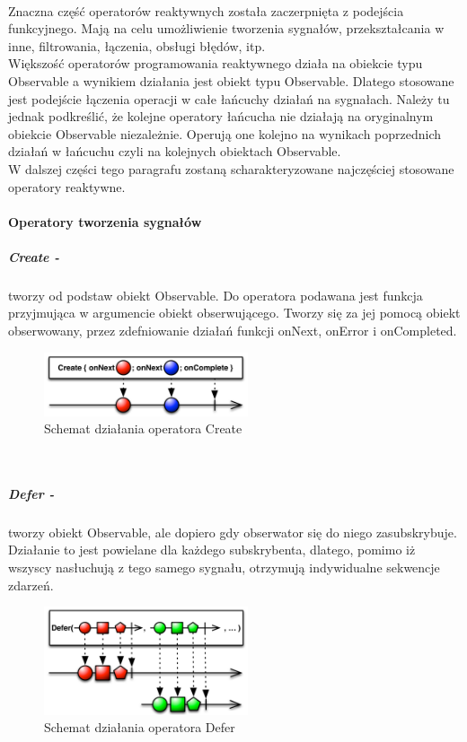\documentclass[12pt,oneside,a4paper]{report}
\begin{document}
\paragraph{}Znaczna część operatorów reaktywnych została zaczerpnięta z podejścia funkcyjnego. Mają na celu umożliwienie tworzenia sygnałów, przekształcania w inne, filtrowania, łączenia, obsługi błędów, itp.\\
Większość operatorów programowania reaktywnego działa na obiekcie typu Observable a wynikiem działania jest obiekt typu Observable. Dlatego stosowane jest podejście łączenia operacji w całe łańcuchy działań na sygnałach. Należy tu jednak podkreślić, że kolejne operatory łańcucha nie działają na oryginalnym obiekcie Observable niezależnie. Operują one kolejno na wynikach poprzednich działań w łańcuchu czyli na kolejnych obiektach Observable. \\
W dalszej części tego paragrafu zostaną scharakteryzowane najczęściej stosowane operatory reaktywne.
\paragraph{Operatory tworzenia sygnałów}
\subparagraph{Create -}tworzy od podstaw obiekt Observable. Do operatora podawana jest funkcja przyjmująca w argumencie obiekt obserwującego. Tworzy się za jej pomocą obiekt obserwowany, przez zdefniowanie działań funkcji onNext, onError i onCompleted. 
\begin{figure}[ht!]
	\centering
	\includegraphics[width=6cm]{create}
	\caption{Schemat działania operatora Create}
	\label{create}
\end{figure}\\
\subparagraph{Defer -}tworzy obiekt Observable, ale dopiero gdy obserwator się do niego zasubskrybuje. Działanie to jest powielane dla każdego subskrybenta, dlatego, pomimo iż wszyscy nasłuchują z tego samego sygnału, otrzymują indywidualne sekwencje zdarzeń. 
\begin{figure}[ht!]
	\centering
	\includegraphics[width=6cm]{defer}
	\caption{Schemat działania operatora Defer}
	\label{defer}
\end{figure}\\\\\\\\\\\\
\end{document}
